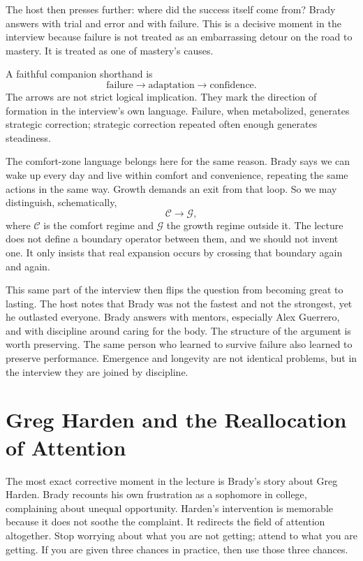 The host then presses further: where did the success itself come from? Brady answers with trial and error and with failure. This is a decisive moment in the interview because failure is not treated as an embarrassing detour on the road to mastery. It is treated as one of mastery's causes.

A faithful companion shorthand is
\begin{equation}
\text{failure} \to \text{adaptation} \to \text{confidence}.
\end{equation}
The arrows are not strict logical implication. They mark the direction of formation in the interview's own language. Failure, when metabolized, generates strategic correction; strategic correction repeated often enough generates steadiness.

The comfort-zone language belongs here for the same reason. Brady says we can wake up every day and live within comfort and convenience, repeating the same actions in the same way. Growth demands an exit from that loop. So we may distinguish, schematically,
\begin{equation}
\mathcal{C} \to \mathcal{G},
\end{equation}
where \(\mathcal{C}\) is the comfort regime and \(\mathcal{G}\) the growth regime outside it. The lecture does not define a boundary operator between them, and we should not invent one. It only insists that real expansion occurs by crossing that boundary again and again.

This same part of the interview then flips the question from becoming great to lasting. The host notes that Brady was not the fastest and not the strongest, yet he outlasted everyone. Brady answers with mentors, especially Alex Guerrero, and with discipline around caring for the body. The structure of the argument is worth preserving. The same person who learned to survive failure also learned to preserve performance. Emergence and longevity are not identical problems, but in the interview they are joined by discipline.

\section{Greg Harden and the Reallocation of Attention}

The most exact corrective moment in the lecture is Brady's story about Greg Harden. Brady recounts his own frustration as a sophomore in college, complaining about unequal opportunity. Harden's intervention is memorable because it does not soothe the complaint. It redirects the field of attention altogether. Stop worrying about what you are not getting; attend to what you are getting. If you are given three chances in practice, then use those three chances.

